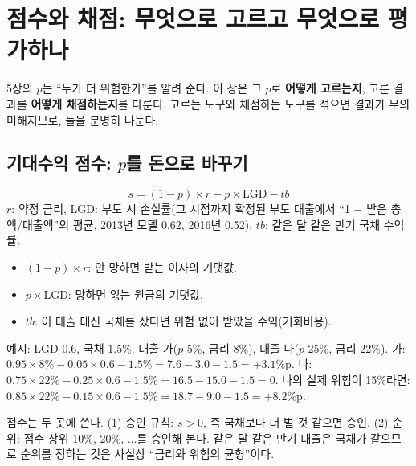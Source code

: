 \chapter{점수와 채점: 무엇으로 고르고 무엇으로 평가하나}

5장의 $p$는 ``누가 더 위험한가''를 알려 준다. 이 장은 그 $p$로 \textbf{어떻게 고르는지}, 고른 결과를 \textbf{어떻게 채점하는지}를 다룬다. 고르는 도구와 채점하는 도구를 섞으면 결과가 무의미해지므로, 둘을 분명히 나눈다.

\section{기대수익 점수: $p$를 돈으로 바꾸기}
\begin{formulabox}[기대수익 점수]
\[ s=(1-p)\times r - p\times \mathrm{LGD} - tb \]
$r$: 약정 금리, LGD: 부도 시 손실률(그 시점까지 확정된 부도 대출에서 ``1 $-$ 받은 총액/대출액''의 평균, 2013년 모델 0.62, 2016년 0.52), $tb$: 같은 달 같은 만기 국채 수익률.
\end{formulabox}
\begin{itemize}[leftmargin=*]
\item $(1-p)\times r$: 안 망하면 받는 이자의 기댓값.
\item $p\times$LGD: 망하면 잃는 원금의 기댓값.
\item $tb$: 이 대출 대신 국채를 샀다면 위험 없이 받았을 수익(기회비용).
\end{itemize}

\begin{workout}
 예시: LGD 0.6, 국채 1.5\%. 대출 가($p$ 5\%, 금리 8\%), 대출 나($p$ 25\%, 금리 22\%).
 가: $0.95\times8\%-0.05\times0.6-1.5\%=7.6-3.0-1.5=+3.1\%$p.
 나: $0.75\times22\%-0.25\times0.6-1.5\%=16.5-15.0-1.5=0$.
 나의 실제 위험이 15\%라면: $0.85\times22\%-0.15\times0.6-1.5\%=18.7-9.0-1.5=+8.2\%$p.
\end{workout}

점수는 두 곳에 쓴다. (1) 승인 규칙: $s>0$, 즉 국채보다 더 벌 것 같으면 승인. (2) 순위: 점수 상위 10\%, 20\%, $\dots$를 승인해 본다. 같은 달 같은 만기 대출은 국채가 같으므로 순위를 정하는 것은 사실상 ``금리와 위험의 균형''이다.

